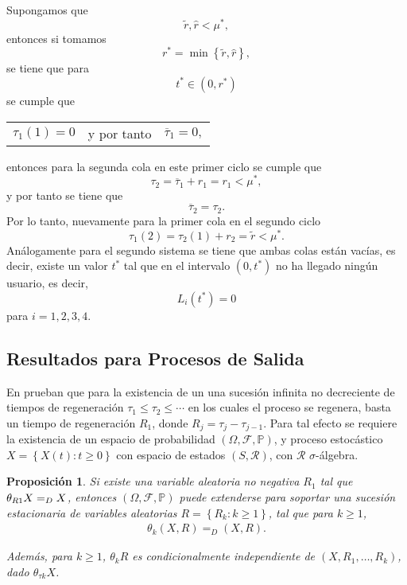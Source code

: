 \documentclass{article}
\newtheorem{Prop}{Proposición}
\newcommand{\prob}{\mathbb{P}}
\begin{document}
Supongamos que $$\tilde{r},\hat{r}<\mu^{*},$$ entonces si tomamos $$r^{*}=\min\left\{\tilde{r},\hat{r}\right\},$$ se tiene que para  $$t^{*}\in\left(0,r^{*}\right)$$ se cumple que 
\begin{center}
\begin{tabular}{lcl}
$\tau_{1}\left(1\right)=0$ & y por tanto & $\overline{\tau}_{1}=0,$
\end{tabular}
\end{center}
entonces para la segunda cola en este primer ciclo se cumple que $$\tau_{2}=\overline{\tau}_{1}+r_{1}=r_{1}<\mu^{*},$$ y por tanto se tiene que  $$\overline{\tau}_{2}=\tau_{2}.$$ Por lo tanto, nuevamente para la primer cola en el segundo ciclo $$\tau_{1}\left(2\right)=\tau_{2}\left(1\right)+r_{2}=\tilde{r}<\mu^{*}.$$ An\'alogamente para el segundo sistema se tiene que ambas colas est\'an vac\'ias, es decir, existe un valor $t^{*}$ tal que en el intervalo $\left(0,t^{*}\right)$ no ha llegado ning\'un usuario, es decir, $$L_{i}\left(t^{*}\right)=0$$ para $i=1,2,3,4$.

\subsection{Resultados para Procesos de Salida}

En \cite{Sigman2} prueban que para la existencia de un una sucesi\'on infinita no decreciente de tiempos de regeneraci\'on $\tau_{1}\leq\tau_{2}\leq\cdots$ en los cuales el proceso se regenera, basta un tiempo de regeneraci\'on $R_{1}$, donde $R_{j}=\tau_{j}-\tau_{j-1}$. Para tal efecto se requiere la existencia de un espacio de probabilidad $\left(\Omega,\mathcal{F},\prob\right)$, y proceso estoc\'astico $\textit{X}=\left\{X\left(t\right):t\geq0\right\}$ con espacio de estados $\left(S,\mathcal{R}\right)$, con $\mathcal{R}$ $\sigma$-\'algebra.

\begin{Prop}
Si existe una variable aleatoria no negativa $R_{1}$ tal que $\theta_{R\footnotesize{1}}X=_{D}X$, entonces $\left(\Omega,\mathcal{F},\prob\right)$ puede extenderse para soportar una sucesi\'on estacionaria de variables aleatorias $R=\left\{R_{k}:k\geq1\right\}$, tal que para $k\geq1$,
\begin{eqnarray*}
\theta_{k}\left(X,R\right)=_{D}\left(X,R\right).
\end{eqnarray*}

Adem\'as, para $k\geq1$, $\theta_{k}R$ es condicionalmente independiente de $\left(X,R_{1},\ldots,R_{k}\right)$, dado $\theta_{\tau k}X$.

\end{Prop}
\end{document}
